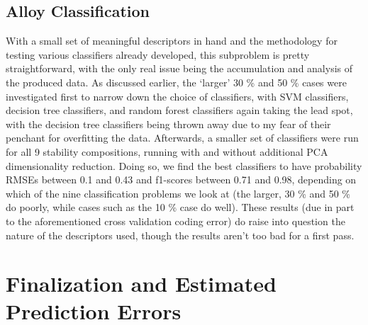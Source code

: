 \documentclass[11pt]{article}
\begin{document}
\subsection{Alloy Classification}
\noindent With a small set of meaningful descriptors in hand and the methodology for testing various classifiers already developed, this subproblem is pretty straightforward, with the only real issue being the accumulation and analysis of the produced data. As discussed earlier, the `larger' 30 \% and 50 \% cases were investigated first to narrow down the choice of classifiers, with SVM classifiers, decision tree classifiers, and random forest classifiers again taking the lead spot, with the decision tree classifiers being thrown away due to my fear of their penchant for overfitting the data. Afterwards, a smaller set of classifiers were run for all 9 stability compositions, running with and without additional PCA dimensionality reduction. Doing so, we find the best classifiers to have probability RMSEs between 0.1 and 0.43 and f1-scores between 0.71 and 0.98, depending on which of the nine classification problems we look at (the larger, 30 \% and 50 \% do poorly, while cases such as the 10 \% case do well). These results (due in part to the aforementioned cross validation coding error) do raise into question the nature of the descriptors used, though the results aren't too bad for a first pass. 

\section{Finalization and Estimated Prediction Errors}
\end{document}
